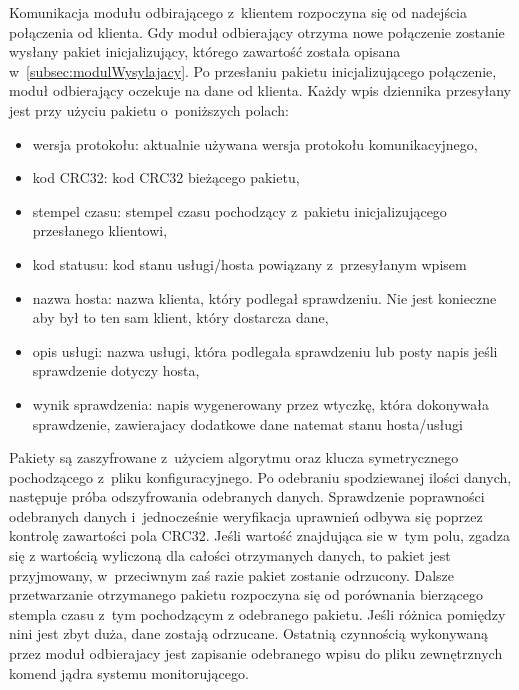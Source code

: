 Komunikacja modułu odbirającego z~klientem rozpoczyna się od nadejścia
połączenia od klienta. Gdy moduł odbierający otrzyma nowe połączenie
zostanie wysłany pakiet inicjalizujący, którego zawartość została
opisana w~\ref{subsec:modulWysylajacy}. Po przesłaniu pakietu
inicjalizującego połączenie, moduł odbierający oczekuje na dane od
klienta. Każdy wpis dziennika przesyłany jest przy użyciu pakietu
o~poniższych polach:

\begin{itemize}
\item wersja protokołu: aktualnie używana wersja protokołu komunikacyjnego,
\item kod CRC32: kod CRC32 bieżącego pakietu,
\item stempel czasu: stempel czasu pochodzący z~pakietu
  inicjalizującego przesłanego klientowi,
\item kod statusu: kod stanu usługi/hosta powiązany z~przesyłanym wpisem
\item nazwa hosta: nazwa klienta, który podlegał sprawdzeniu. Nie jest
  konieczne aby był to ten sam klient, który dostarcza dane,
\item opis usługi: nazwa usługi, która podlegała sprawdzeniu lub posty
  napis jeśli sprawdzenie dotyczy hosta,
\item wynik sprawdzenia: napis wygenerowany przez wtyczkę, która
  dokonywała sprawdzenie, zawierajacy dodatkowe dane natemat stanu
  hosta/usługi
\end{itemize}

Pakiety są zaszyfrowane z~użyciem algorytmu oraz klucza symetrycznego
pochodzącego z~pliku konfiguracyjnego. Po odebraniu spodziewanej
ilości danych, następuje próba odszyfrowania odebranych
danych. Sprawdzenie poprawności odebranych danych i~jednocześnie
weryfikacja uprawnień odbywa się poprzez kontrolę zawartości pola
CRC32. Jeśli wartość znajdująca sie w~tym polu, zgadza się z wartością
wyliczoną dla całości otrzymanych danych, to pakiet jest przyjmowany,
w~przeciwnym zaś razie pakiet zostanie odrzucony. Dalsze przetwarzanie
otrzymanego pakietu rozpoczyna się od porównania bierzącego stempla
czasu z~tym pochodzącym z odebranego pakietu. Jeśli różnica pomiędzy
nini jest zbyt duża, dane zostają odrzucane. Ostatnią czynnością
wykonywaną przez moduł odbierajacy jest zapisanie odebranego wpisu do
pliku zewnętrznych komend jądra systemu monitorującego.

